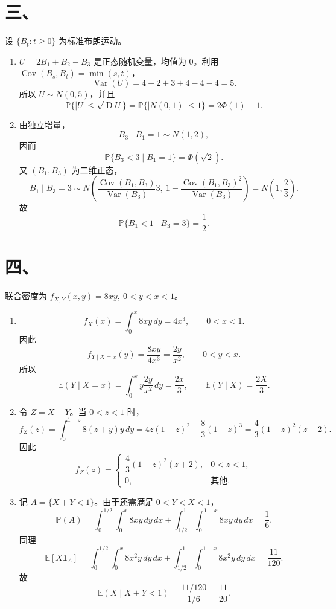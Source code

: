 \documentclass[UTF8,zihao=-4,fontset=windows]{ctexart}
\newcommand{\Prob}{\mathbb P}
\newcommand{\EX}{\mathbb E}
\newcommand{\DD}{\operatorname D}
\newcommand{\Var}{\operatorname{Var}}
\newcommand{\Cov}{\operatorname{Cov}}
\begin{document}
\section*{三、}
设 $\{B_t:t\ge0\}$ 为标准布朗运动。
\begin{enumerate}
  \item $U=2B_1+B_2-B_3$ 是正态随机变量，均值为 $0$。利用 $\Cov(B_s,B_t)=\min(s,t)$，
  \[
    \Var(U)=4+2+3+4-4-4=5.
  \]
  所以 $U\sim N(0,5)$，并且
  \[
    \Prob\{|U|\le\sqrt{\DD U}\}
    =\Prob\{|N(0,1)|\le 1\}
    =2\Phi(1)-1.
  \]

  \item 由独立增量，
  \[
    B_3\mid B_1=1\sim N(1,2),
  \]
  因而
  \[
    \Prob\{B_3<3\mid B_1=1\}=\Phi(\sqrt2).
  \]
  又 $(B_1,B_3)$ 为二维正态，
  \[
    B_1\mid B_3=3\sim N\left(\frac{\Cov(B_1,B_3)}{\Var(B_3)}3,\ 
    1-\frac{\Cov(B_1,B_3)^2}{\Var(B_3)}\right)
    =N\left(1,\frac23\right).
  \]
  故
  \[
    \Prob\{B_1<1\mid B_3=3\}=\frac12.
  \]
\end{enumerate}

\section*{四、}
联合密度为 $f_{X,Y}(x,y)=8xy,\ 0<y<x<1$。
\begin{enumerate}
  \item
  \[
    f_X(x)=\int_0^x 8xy\,dy=4x^3,\qquad 0<x<1.
  \]
  因此
  \[
    f_{Y\mid X=x}(y)=\frac{8xy}{4x^3}=\frac{2y}{x^2},\qquad 0<y<x.
  \]
  所以
  \[
    \EX(Y\mid X=x)=\int_0^x y\frac{2y}{x^2}\,dy=\frac{2x}{3},
    \qquad \EX(Y\mid X)=\frac{2X}{3}.
  \]

  \item 令 $Z=X-Y$。当 $0<z<1$ 时，
  \[
    f_Z(z)=\int_0^{1-z}8(z+y)y\,dy
    =4z(1-z)^2+\frac83(1-z)^3
    =\frac43(1-z)^2(z+2).
  \]
  因此
  \[
    f_Z(z)=
    \begin{cases}
      \dfrac43(1-z)^2(z+2), & 0<z<1,\\
      0, & \text{其他}.
    \end{cases}
  \]

  \item 记 $A=\{X+Y<1\}$。由于还需满足 $0<Y<X<1$，
  \[
    \Prob(A)=\int_0^{1/2}\int_0^x8xy\,dy\,dx+
    \int_{1/2}^1\int_0^{1-x}8xy\,dy\,dx=\frac16.
  \]
  同理
  \[
    \EX[X\mathbf 1_A]
    =\int_0^{1/2}\int_0^x8x^2y\,dy\,dx+
    \int_{1/2}^1\int_0^{1-x}8x^2y\,dy\,dx=\frac{11}{120}.
  \]
  故
  \[
    \EX(X\mid X+Y<1)=\frac{11/120}{1/6}=\frac{11}{20}.
  \]
\end{enumerate}
\end{document}
